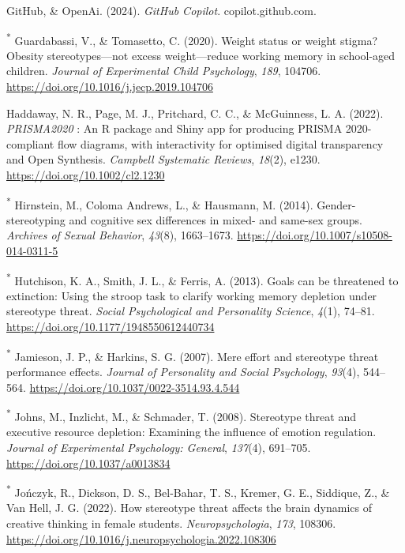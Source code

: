 \documentclass[
  stu, a4paper,floatsintext]{apa7}
\newlength{\cslhangindent}
\newenvironment{CSLReferences}[2] %
 {\begin{list}{}{%
  \setlength{\itemindent}{0pt}
  \setlength{\leftmargin}{0pt}
  \setlength{\parsep}{0pt}
  \ifodd #1
   \setlength{\leftmargin}{\cslhangindent}
   \setlength{\itemindent}{-1\cslhangindent}
  \fi
  \setlength{\itemsep}{#2\baselineskip}}}
 {\end{list}}
\begin{document}
\begin{CSLReferences}{1}{0}
GitHub, \& OpenAi. (2024). \emph{{GitHub Copilot}}. copilot.github.com.

\textsuperscript{*} Guardabassi, V., \& Tomasetto, C. (2020). Weight status or weight stigma? {Obesity} stereotypes---not excess weight---reduce working memory in school-aged children. \emph{Journal of Experimental Child Psychology}, \emph{189}, 104706. \url{https://doi.org/10.1016/j.jecp.2019.104706}

Haddaway, N. R., Page, M. J., Pritchard, C. C., \& McGuinness, L. A. (2022). {\emph{PRISMA2020}} : {An R} package and {Shiny} app for producing {PRISMA} 2020-compliant flow diagrams, with interactivity for optimised digital transparency and {Open Synthesis}. \emph{Campbell Systematic Reviews}, \emph{18}(2), e1230. \url{https://doi.org/10.1002/cl2.1230}

\textsuperscript{*} Hirnstein, M., Coloma Andrews, L., \& Hausmann, M. (2014). Gender-stereotyping and cognitive sex differences in mixed- and same-sex groups. \emph{Archives of Sexual Behavior}, \emph{43}(8), 1663--1673. \url{https://doi.org/10.1007/s10508-014-0311-5}

\textsuperscript{*} Hutchison, K. A., Smith, J. L., \& Ferris, A. (2013). Goals can be threatened to extinction: {Using} the stroop task to clarify working memory depletion under stereotype threat. \emph{Social Psychological and Personality Science}, \emph{4}(1), 74--81. \url{https://doi.org/10.1177/1948550612440734}

\textsuperscript{*} Jamieson, J. P., \& Harkins, S. G. (2007). Mere effort and stereotype threat performance effects. \emph{Journal of Personality and Social Psychology}, \emph{93}(4), 544--564. \url{https://doi.org/10.1037/0022-3514.93.4.544}

\textsuperscript{*} Johns, M., Inzlicht, M., \& Schmader, T. (2008). Stereotype threat and executive resource depletion: {Examining} the influence of emotion regulation. \emph{Journal of Experimental Psychology: General}, \emph{137}(4), 691--705. \url{https://doi.org/10.1037/a0013834}

\textsuperscript{*} Jończyk, R., Dickson, D. S., Bel-Bahar, T. S., Kremer, G. E., Siddique, Z., \& Van Hell, J. G. (2022). How stereotype threat affects the brain dynamics of creative thinking in female students. \emph{Neuropsychologia}, \emph{173}, 108306. \url{https://doi.org/10.1016/j.neuropsychologia.2022.108306}


\end{CSLReferences}
\end{document}
